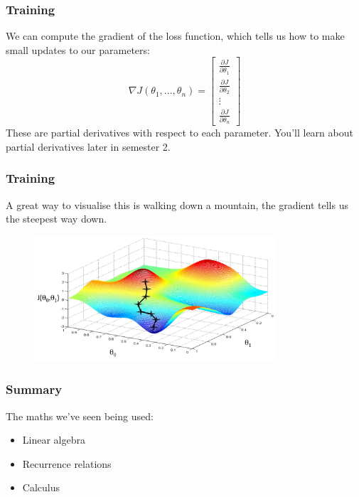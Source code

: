 \documentclass{beamer}
\begin{document}
\begin{frame}
    \frametitle{Training}
    We can compute the \alert{gradient} of the loss function, which tells us how to make small updates to our parameters:
    \[\nabla J(\theta_1,... , \theta_n) = \begin{bmatrix}
            \frac{\partial J}{\partial \theta_1} \\[6pt]
            \frac{\partial J}{\partial \theta_2} \\[6pt]
            \vdots                               \\[6pt]
            \frac{\partial J}{\partial \theta_n}
        \end{bmatrix}\]
    These are partial derivatives with respect to each parameter. You'll learn about partial derivatives later in semester 2.
\end{frame}

\begin{frame}
    \frametitle{Training}
    A great way to visualise this is walking down a mountain, the gradient tells us the steepest way down.
    \begin{figure}
        \centering
        \includegraphics[width=0.8\textwidth]{images/gradient-descent.png}
    \end{figure}
\end{frame}

\begin{frame}
    \frametitle{Summary}
    The maths we've seen being used:
    \begin{itemize}
        \item Linear algebra
        \item Recurrence relations
        \item Calculus
    \end{itemize}
\end{frame}

\end{document}
